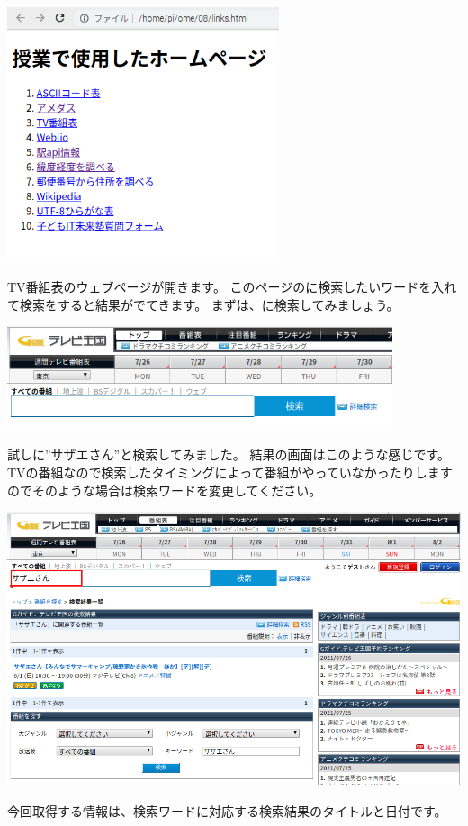 \begin{center}
\includegraphics[width=0.6\textwidth]{./text08-img/textbook-img017.png}

\end{center}


\bigskip


TV番組表のウェブページが開きます。
このページのに検索したいワードを入れて検索をすると結果がでてきます。
まずは、に検索してみましょう。



\begin{center}
\includegraphics[width=0.85\textwidth]{./text08-img/textbook-img041.png}

\end{center}
\clearpage
試しに”サザエさん”と検索してみました。
結果の画面はこのような感じです。
TVの番組なので検索したタイミングによって番組がやっていなかったりしますのでそのような場合は検索ワードを変更してください。



\begin{center}
\includegraphics[width=\textwidth]{./text08-img/textbook-img042.png}

\end{center}
今回取得する情報は、検索ワードに対応する検索結果のタイトルと日付です。

